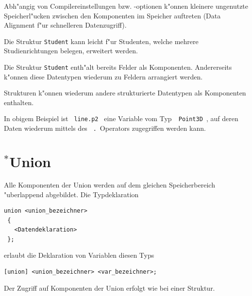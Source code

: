 Abh"angig von Compilereinstellungen bzw. -optionen k"onnen kleinere
ungenutzte Speicherl"ucken zwischen den Komponenten im Speicher auftreten
(Data Alignment f"ur schnelleren Datenzugriff).

Die Struktur \verb|Student| kann leicht f"ur Studenten, welche
mehrere Studienrichtungen belegen, erweitert werden.
%
%

Die Struktur \verb|Student| enth"alt
bereits Felder als Komponenten. Andererseits k"onnen
diese Datentypen wiederum zu Feldern arrangiert werden.
%
\label{ex:522}

Strukturen k"onnen wiederum andere strukturierte Datentypen als
Komponenten enthalten.
%

%

In obigem Beispiel ist \verb| line.p2 | eine Variable
vom Typ~\verb| Point3D |, auf deren  Daten wiederum mittels des
\verb| .|~Operators zugegriffen werden kann.
%
%
%

\section{\mbox{}$^{*}$Union}
\label{p:5.4}
%
%
Alle Komponenten der Union werden auf dem gleichen Speicherbereich
"uberlappend abgebildet. Die Typdeklaration

\mbox{}\hfill
\begin{minipage} {0.5\textwidth}
\begin{verbatim}
union <union_bezeichner>
 {
   <Datendeklaration>
 };
\end{verbatim}
\end{minipage}
\hfill\mbox{}

erlaubt die Deklaration von Variablen diesen Typs

\mbox{}\hfill
\begin{minipage} {0.8\textwidth}
\begin{verbatim}
[union] <union_bezeichner> <var_bezeichner>;
\end{verbatim}
\end{minipage}
\hfill\mbox{}

Der Zugriff auf Komponenten der Union erfolgt wie bei einer Struktur.
%
%

